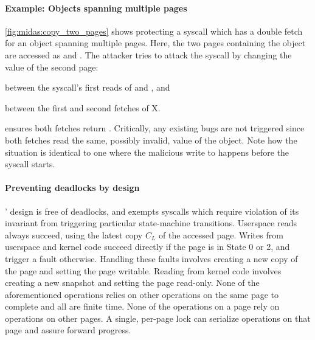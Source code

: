 \paragraph{Example: Objects spanning multiple pages}
\autoref{fig:midas:copy_two_pages} shows \midas protecting a syscall which
has a double fetch for an object spanning multiple pages.
Here, the two pages containing the object  are accessed as
 and .
The attacker tries to attack the syscall by changing the value of the
second page:
\begin{inparaenum}
\item between the syscall's first reads of  and , and
\item between the first and second fetches of X.
\end{inparaenum}
\midas ensures both fetches return .
Critically, any existing \tocttou bugs are not triggered since both fetches
read the same, possibly invalid, value of the object.
Note how the situation is identical to one where the malicious write
to  happens before the syscall starts.

\paragraph{Preventing deadlocks by design}
\midas' design is free of deadlocks, and exempts syscalls which
require violation of its invariant from triggering particular
state-machine transitions.
Userspace reads always succeed, using the latest copy $C_L$ of the
accessed page.
Writes from userspace and kernel code succeed directly if the
page is in State 0 or 2, and trigger a fault otherwise.
Handling these faults involves creating a new copy of the page and
setting the page writable.
Reading from kernel code involves creating a new snapshot and
setting the page read-only.
None of the aforementioned operations relies on other operations
on the same page to complete and all are finite time.
None of the operations on a page rely on operations on other pages.
A single, per-page lock can serialize operations on that page
and assure forward progress.

